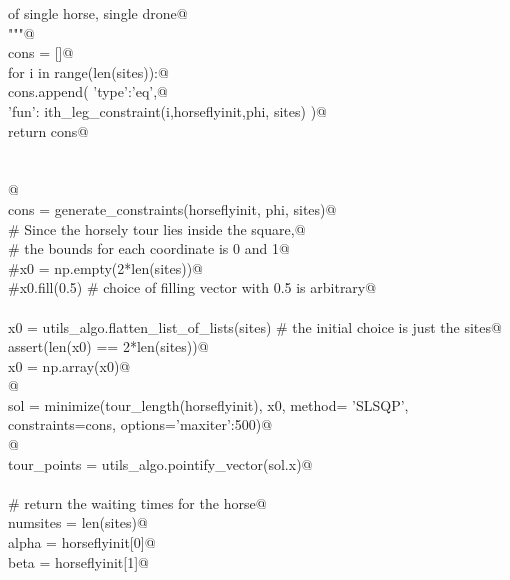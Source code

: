 \documentclass[11.5pt]{report}
\begin{document}
\begin{flushleft}
\begin{list}{}{}
\mbox{}\verb@        of single horse, single drone@\\
\mbox{}\verb@        """@\\
\mbox{}\verb@        cons = []@\\
\mbox{}\verb@        for i in range(len(sites)):@\\
\mbox{}\verb@            cons.append( { 'type':'eq',@\\
\mbox{}\verb@                            'fun': ith_leg_constraint(i,horseflyinit,phi, sites) } )@\\
\mbox{}\verb@        return cons@\\
\mbox{}\verb@@\\
\mbox{}\verb@@\\
\mbox{}\verb@    @\\
\mbox{}\verb@    cons = generate_constraints(horseflyinit, phi, sites)@\\
\mbox{}\verb@    # Since the horsely tour lies inside the square,@\\
\mbox{}\verb@    # the bounds for each coordinate is 0 and 1@\\
\mbox{}\verb@    #x0 = np.empty(2*len(sites))@\\
\mbox{}\verb@    #x0.fill(0.5) # choice of filling vector with 0.5 is arbitrary@\\
\mbox{}\verb@@\\
\mbox{}\verb@    x0 = utils_algo.flatten_list_of_lists(sites) # the initial choice is just the sites@\\
\mbox{}\verb@    assert(len(x0) == 2*len(sites))@\\
\mbox{}\verb@    x0 = np.array(x0)@\\
\mbox{}\verb@    @\\
\mbox{}\verb@    sol = minimize(tour_length(horseflyinit), x0, method= 'SLSQP', \@\\
\mbox{}\verb@                               constraints=cons, options={'maxiter':500})@\\
\mbox{}\verb@    @\\
\mbox{}\verb@    tour_points = utils_algo.pointify_vector(sol.x)@\\
\mbox{}\verb@@\\
\mbox{}\verb@    # return the waiting times for the horse@\\
\mbox{}\verb@    numsites            = len(sites)@\\
\mbox{}\verb@    alpha               = horseflyinit[0]@\\
\mbox{}\verb@    beta                = horseflyinit[1]@\\

\end{list}
\end{flushleft}
\end{document}
